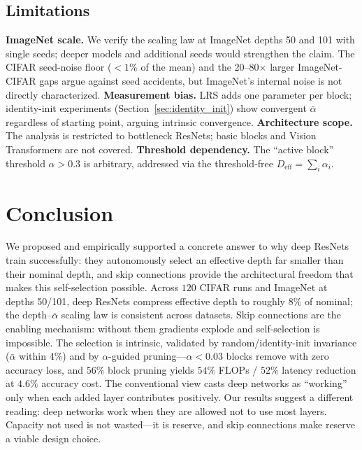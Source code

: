 \documentclass{bmvc2k}
\begin{document}
\subsection{Limitations}

\textbf{ImageNet scale.} We verify the scaling law at ImageNet depths 50 and 101 with single seeds; deeper models and additional seeds would strengthen the claim. The CIFAR seed-noise floor ($<1\%$ of the mean) and the 20--80$\times$ larger ImageNet-CIFAR gaps argue against seed accidents, but ImageNet's internal noise is not directly characterized. \textbf{Measurement bias.} LRS adds one parameter per block; identity-init experiments (Section~\ref{sec:identity_init}) show convergent $\bar{\alpha}$ regardless of starting point, arguing intrinsic convergence. \textbf{Architecture scope.} The analysis is restricted to bottleneck ResNets; basic blocks and Vision Transformers are not covered. \textbf{Threshold dependency.} The ``active block'' threshold $\alpha > 0.3$ is arbitrary, addressed via the threshold-free $D_\text{eff} = \sum_i \alpha_i$.

\section{Conclusion}
\label{sec:conclusion}

We proposed and empirically supported a concrete answer to why deep ResNets train successfully: they autonomously select an effective depth far smaller than their nominal depth, and skip connections provide the architectural freedom that makes this self-selection possible. Across $120$ CIFAR runs and ImageNet at depths 50/101, deep ResNets compress effective depth to roughly $8\%$ of nominal; the depth--$\bar{\alpha}$ scaling law is consistent across datasets. Skip connections are the enabling mechanism: without them gradients explode and self-selection is impossible. The selection is intrinsic, validated by random/identity-init invariance ($\bar{\alpha}$ within $4\%$) and by $\alpha$-guided pruning---$\alpha < 0.03$ blocks remove with zero accuracy loss, and $56\%$ block pruning yields $54\%$ FLOPs / $52\%$ latency reduction at $4.6\%$ accuracy cost. The conventional view casts deep networks as ``working'' only when each added layer contributes positively. Our results suggest a different reading: deep networks work when they are allowed not to use most layers. Capacity not used is not wasted---it is reserve, and skip connections make reserve a viable design choice.


\end{document}
